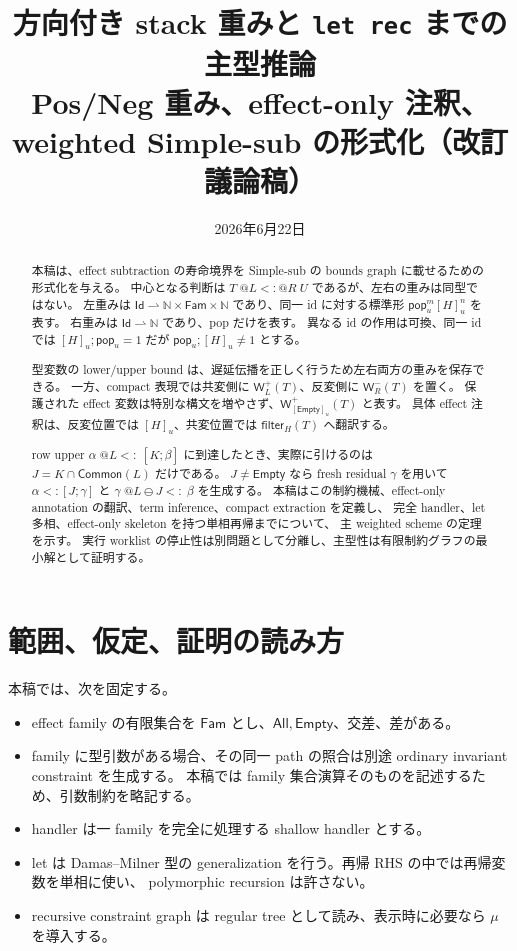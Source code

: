 \documentclass[uplatex,dvipdfmx,a4paper,10.5pt]{jsarticle}
\title{方向付き stack 重みと \texttt{let rec} までの主型推論\\
\large Pos/Neg 重み、effect-only 注釈、weighted Simple-sub の形式化（改訂議論稿）}
\author{}
\date{2026年6月22日}
\makeatletter
\theoremstyle{jpplain}
\newcommand{\Fam}{\mathsf{Fam}}
\newcommand{\Id}{\mathsf{Id}}
\newcommand{\Nat}{\mathbb N}
\newcommand{\All}{\mathsf{All}}
\newcommand{\Empty}{\mathsf{Empty}}
\newcommand{\Common}{\mathsf{Common}}
\newcommand{\Filter}[2]{\mathsf{filter}_{#1}(#2)}
\newcommand{\PWeight}[2]{\mathsf{W}^{+}_{#1}(#2)}
\newcommand{\NWeight}[2]{\mathsf{W}^{-}_{#1}(#2)}
\newcommand{\takeop}[2]{[#1]_{#2}}
\newcommand{\popop}[1]{\mathsf{pop}_{#1}}
\newcommand{\row}[2]{[#1;#2]}
\newcommand{\wsub}[4]{#1\;@#2\mathrel{<:}@#3\;#4}
\newcommand{\lsub}[3]{#1\;@#2\mathrel{<:}\;#3}
\newcommand{\subty}[2]{#1\mathrel{<:}#2}
\makeatother
\begin{document}
\maketitle

\begin{abstract}
本稿は、effect subtraction の寿命境界を Simple-sub の bounds graph に載せるための形式化を与える。
中心となる判断は $\wsub{T}{L}{R}{U}$ であるが、左右の重みは同型ではない。
左重みは $\Id\rightharpoonup\Nat\times\Fam\times\Nat$ であり、同一 id に対する標準形
$\popop{u}^{m}\takeop{H}{u}^{n}$ を表す。
右重みは $\Id\rightharpoonup\Nat$ であり、pop だけを表す。
異なる id の作用は可換、同一 id では $\takeop{H}{u};\popop{u}=1$ だが
$\popop{u};\takeop{H}{u}\neq 1$ とする。

型変数の lower/upper bound は、遅延伝播を正しく行うため左右両方の重みを保存できる。
一方、compact 表現では共変側に $\PWeight{L}{T}$、反変側に $\NWeight{R}{T}$ を置く。
保護された effect 変数は特別な構文を増やさず、$\PWeight{\takeop{\Empty}{u}}{T}$ と表す。
具体 effect 注釈は、反変位置では $\takeop{H}{u}$、共変位置では $\Filter{H}{T}$ へ翻訳する。

row upper $\lsub{\alpha}{L}{\row{K}{\beta}}$ に到達したとき、実際に引けるのは
$J=K\cap\Common(L)$ だけである。
$J\neq\Empty$ なら fresh residual $\gamma$ を用いて
$\subty{\alpha}{\row{J}{\gamma}}$ と
$\lsub{\gamma}{L\ominus J}{\beta}$ を生成する。
本稿はこの制約機械、effect-only annotation の翻訳、term inference、compact extraction を定義し、
完全 handler、let 多相、effect-only skeleton を持つ単相再帰までについて、
主 weighted scheme の定理を示す。
実行 worklist の停止性は別問題として分離し、主型性は有限制約グラフの最小解として証明する。
\end{abstract}

\tableofcontents

\section{範囲、仮定、証明の読み方}

本稿では、次を固定する。

\begin{itemize}
  \item effect family の有限集合を $\Fam$ とし、$\All,\Empty$、交差、差がある。
  \item family に型引数がある場合、その同一 path の照合は別途 ordinary invariant constraint を生成する。
        本稿では family 集合演算そのものを記述するため、引数制約を略記する。
  \item handler は一 family を完全に処理する shallow handler とする。
  \item let は Damas--Milner 型の generalization を行う。再帰 RHS の中では再帰変数を単相に使い、
        polymorphic recursion は許さない。
  \item recursive constraint graph は regular tree として読み、表示時に必要なら $\mu$ を導入する。
\end{itemize}
\end{document}
